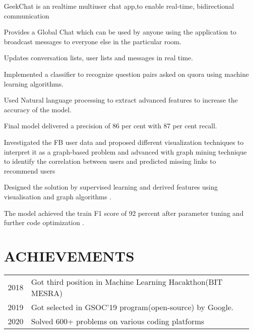 \documentclass[]{deedy-resume-openfont}
\begin{document}
\begin{minipage}[t]{0.66\textwidth}
GeekChat is an realtime multiuser chat app,to enable real-time, bidirectional communication
\begin{tightemize}
\item Provides a Global Chat which can be used by anyone using the application to
broadcast messages to everyone else in the particular room.
\item Updates conversation lists, user lists and messages in real time.
\end{tightemize}
\sectionsep

Implemented a classifier to recognize question pairs asked on quora using machine
learning algorithms.
\begin{tightemize}
\item Used Natural language processing to extract advanced features to increase the
accuracy of the model.
\item Final model delivered a precision of 86 per cent with 87 per cent recall.
\end{tightemize}
\sectionsep


Investigated the FB user data and proposed different visualization techniques to
interpret it as a graph-based problem and advanced with graph mining technique to
identify the correlation between users and predicted missing links to recommend
users
\begin{tightemize}
\item Designed the solution by supervised learning and derived features using
visualisation and graph algorithms .
\item The model achieved the train F1 score of 92 percent after parameter tuning
and further code optimization .
\end{tightemize}
\sectionsep



\section{ACHIEVEMENTS} 
\begin{tabular}{rll}
2018	    & Got third position in Machine Learning Hacakthon(BIT MESRA)\\
2019        & Got selected in GSOC'19 program(open-source) by Google.\\
2020        &Solved 600+ problems on various coding platforms
\end{tabular}
\sectionsep



\end{minipage} 
\end{document}
